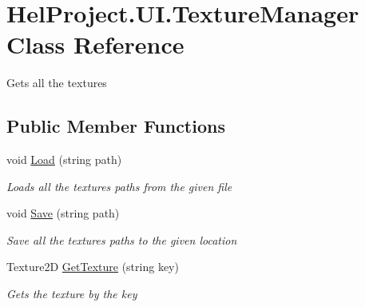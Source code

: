 \hypertarget{class_hel_project_1_1_u_i_1_1_texture_manager}{}\section{Hel\+Project.\+U\+I.\+Texture\+Manager Class Reference}
\label{class_hel_project_1_1_u_i_1_1_texture_manager}


Gets all the textures  


\subsection*{Public Member Functions}
\begin{DoxyCompactItemize}
\item 
void \hyperlink{class_hel_project_1_1_u_i_1_1_texture_manager_ada156bc3a5f02b869a558d3ed2fd73c2}{Load} (string path)
\begin{DoxyCompactList}\small\item\em Loads all the textures paths from the given file \end{DoxyCompactList}\item 
void \hyperlink{class_hel_project_1_1_u_i_1_1_texture_manager_af20f01be3ff211887c33209abdeb72e5}{Save} (string path)
\begin{DoxyCompactList}\small\item\em Save all the textures paths to the given location \end{DoxyCompactList}\item 
Texture2\+D \hyperlink{class_hel_project_1_1_u_i_1_1_texture_manager_ae9be5cc8f6ffa84e48fdcc2a132cf6d0}{Get\+Texture} (string key)
\begin{DoxyCompactList}\small\item\em Gets the texture by the key \end{DoxyCompactList}\end{DoxyCompactItemize}
